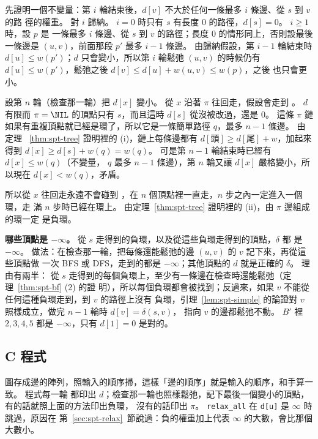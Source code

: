 \begin{whybox}
先證明一個不變量：第 $i$ 輪結束後，$d[v]$ 不大於任何一條最多 $i$ 條邊、從 $s$ 到 $v$ 的路
徑的權重。 對 $i$ 歸納。 $i = 0$ 時只有 $s$ 有長度 $0$ 的路徑，$d[s] = 0$。 $i \ge 1$ 時，設 $p$ 是
一條最多 $i$ 條邊、從 $s$ 到 $v$ 的路徑；長度 $0$ 的情形同上，否則設最後一條邊是 $(u, v)$，前面那段
$p'$ 最多 $i - 1$ 條邊。 由歸納假設，第 $i - 1$ 輪結束時 $d[u] \le w(p')$；$d$ 只會變小，所以第
$i$ 輪鬆弛 $(u, v)$ 的時候仍有 $d[u] \le w(p')$，鬆弛之後 $d[v] \le d[u] + w(u, v) \le w(p)$，之後
也只會更小。

設第 $n$ 輪（檢查那一輪）把 $d[x]$ 變小。 從 $x$ 沿著 $\pi$ 往回走，假設會走到 \NIL。
$d$ 有限而 $\pi = \NIL$ 的頂點只有 $s$，而且這時 $d[s]$ 從沒被改過，還是 $0$。 這條
$\pi$ 鏈如果有重複頂點就已經是環了，所以它是一條簡單路徑 $q$，最多 $n - 1$ 條邊。 由定理
~\ref{thm:spt-tree} 證明裡的 (i)，鏈上每條邊都有 $d[\text{頭}] \ge d[\text{尾}] + w$，加起來
得到 $d[x] \ge d[s] + w(q) = w(q)$。 可是第 $n - 1$ 輪結束時已經有 $d[x] \le w(q)$（不變量，
$q$ 最多 $n - 1$ 條邊），第 $n$ 輪又讓 $d[x]$ 嚴格變小，所以現在 $d[x] < w(q)$，矛盾。

所以從 $x$ 往回走永遠不會碰到 \NIL，在 $n$ 個頂點裡一直走，$n$ 步之內一定進入一個環，走
滿 $n$ 步時已經在環上。 由定理~\ref{thm:spt-tree} 證明裡的 (ii)，由 $\pi$ 邊組成的環一定
是負環。
\end{whybox}

\textbf{哪些頂點是 $-\infty$。} 從 $s$ 走得到的負環，以及從這些負環走得到的頂點，$\delta$ 都
是 $-\infty$。 做法：在檢查那一輪，把每條還能鬆弛的邊 $(u, v)$ 的 $v$ 記下來，再從這些頂點做
一次 BFS 或 DFS，走到的都是 $-\infty$；其他頂點的 $d$ 就是正確的 $\delta$。 理由有兩半：
從 $s$ 走得到的每個負環上，至少有一條邊在檢查時還能鬆弛（定理~\ref{thm:spt-bf} (2) 的證
明），所以每個負環都會被找到；反過來，如果 $v$ 不能從任何這種負環走到，到 $v$ 的路徑上沒有
負環，引理~\ref{lem:spt-simple} 的論證對 $v$ 照樣成立，做完 $n - 1$ 輪時 $d[v] = \delta(s, v)$，
指向 $v$ 的邊都鬆弛不動。 $B'$ 裡 $2, 3, 4, 5$ 都是 $-\infty$，只有 $d[1] = 0$ 是對的。

\subsection{C 程式}

圖存成邊的陣列，照輸入的順序掃，這樣「邊的順序」就是輸入的順序，和手算一致。 程式每一輪
都印出 $d$；檢查那一輪也照樣鬆弛，記下最後一個變小的頂點，有的話就照上面的方法印出負環，
沒有的話印出 $\pi$。 \texttt{relax\_all} 在 \texttt{d[u]} 是 $\infty$ 時跳過，原因在
第~\ref{sec:spt-relax}~節說過：負的權重加上代表 $\infty$ 的大數，會比那個大數小。


